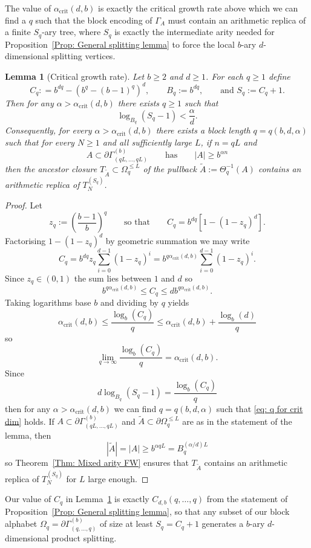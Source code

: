 \documentclass[11pt]{amsart}
\newcommand\labs[1]{\left\lvert#1\right\rvert}
\renewcommand{\leq}{\leqslant}
\renewcommand{\geq}{\geqslant}
\theoremstyle{plain}
\newtheorem{lem}[thm]{Lemma}
\theoremstyle{definition}
\theoremstyle{remark}
\begin{document}
The value of $\alpha_{\text{crit}}(d,b)$ is exactly the critical growth rate above which we can find a $q$ such that the block encoding of $\Gamma_A$ must contain an arithmetic replica of a finite $S_q$-ary tree, where $S_q$ is exactly the intermediate arity needed for Proposition~\ref{Prop: General splitting lemma} to force the local $b$-ary $d$-dimensional splitting vertices.
\begin{lem}[Critical growth rate]\label{Lemma: critical growth rate}
Let $b\geq 2$ and $d\geq 1$. For each $q\geq 1$ define
\[ C_q: = b^{dq} - (b^q - (b-1)^q)^d, \qquad B_q:=b^{dq}, \qquad \text{and }S_q:= C_q+1.\]
Then for any $\alpha > \alpha_{\text{crit}}(d,b)$ there exists $q\geq 1$ such that
\begin{equation}\label{eq: q for crit dim}
\log_{B_q}(S_q-1) < \frac{\alpha}{d}.
\end{equation}
Consequently, for every $\alpha > \alpha_{\text{crit}}(d,b)$ there exists a block length $q=q(b,d,\alpha)$ such that for every $N\geq 1$ and all sufficiently large $L$, if $n=qL$ and
\[ A\subset \partial \Gamma_{(qL,\ldots,qL)}^{(b)} \qquad \text{has} \qquad \labs{A}\geq b^{\alpha n}\]
then the ancestor closure $T_{\tilde{A}}\subset \Omega_q^{\leq L}$ of the pullback $\tilde{A}:= \Theta_q^{-1}(A)$ contains an arithmetic replica of $T_N^{(S_q)}$.
\end{lem}
\begin{proof}
Let
\[ z_q:= \left(\frac{b-1}{b}\right)^q \qquad \text{so that}\qquad C_q = b^{dq} \left[1-(1-z_q)^d \right].\]
Factorising $1-(1-z_q)^d$ by geometric summation we may write
\[
C_q = b^{dq} z_q \sum_{i=0}^{d-1}(1-z_q)^i = b^{q \alpha_{\text{crit}}(d,b)} \sum_{i=0}^{d-1}(1-z_q)^i.
\]
Since $z_q \in (0,1)$ the sum lies between $1$ and $d$ so
\[ b^{q \alpha_{\text{crit}}(d,b)} \leq C_q \leq d b^{q \alpha_{\text{crit}}(d,b)}.\] 
Taking logarithms base $b$ and dividing by $q$ yields
\[ \alpha_{\text{crit}}(d,b) \leq \frac{\log_b(C_q)}{q} \leq \alpha_{\text{crit}}(d,b) + \frac{\log_b(d)}{q}\]
so
\[ \lim_{q\to \infty} \frac{\log_b(C_q)}{q} = \alpha_{\text{crit}}(d,b).\]
Since
\[ d \log_{B_q}(S_q -1) = \frac{\log_b(C_q)}{q}\]
then for any $\alpha > \alpha_{\text{crit}}(d,b)$ we can find $q=q(b,d,\alpha)$ such that \eqref{eq: q for crit dim} holds. If $A\subset \partial \Gamma_{(qL,\ldots,qL)}^{(b)}$ and $\tilde{A}\subset \partial \Omega_q^{\leq L}$ are as in the statement of the lemma, then
\[ |\tilde{A}| = \labs{A} \geq b^{\alpha qL} = B_q^{(\alpha/d)L}\]
so Theorem~\ref{Thm: Mixed arity FW} ensures that $T_{\tilde{A}}$ contains an arithmetic replica of $T_N^{(S_q)}$ for $L$ large enough.
\end{proof}
Our value of $C_q$ in Lemma~\ref{Lemma: critical growth rate} is exactly $C_{d,b}(q,\ldots,q)$ from the statement of Proposition~\ref{Prop: General splitting lemma}, so that any subset of our block alphabet $\Omega_q = \partial \Gamma_{(q,\ldots,q)}^{(b)}$ of size at least $S_q = C_q +1$ generates a $b$-ary $d$-dimensional product splitting.
\end{document}
